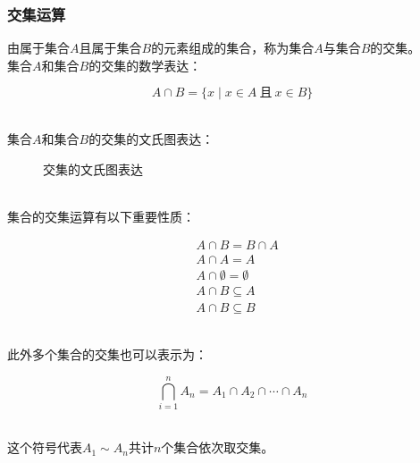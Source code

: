 \documentclass[UTF8]{ctexart}
\begin{document}
\subsubsection{交集运算}
    由属于集合$A$且属于集合$B$的元素组成的集合，称为集合$A$与集合$B$的交集。\\[3mm]
    集合$A$和集合$B$的交集的数学表达：
    \begin{large}
        \begin{equation*}
            A\cap B=\big\{ x\mid x\in A~\text{且}~x\in B\big\}
        \end{equation*}
    \end{large}\\
    集合$A$和集合$B$的交集的文氏图表达：
    \begin{figure}[h]
        \begin{center}
            \caption{交集的文氏图表达}
        \end{center}
    \end{figure}\\
    集合的交集运算有以下重要性质：
    \begin{large}
        \begin{align*}
            &A\cap B=B\cap A\\[3mm]
            &A\cap A=A\\[3mm]
            &A\cap \emptyset=\emptyset\\[3mm]
            &A\cap B\subseteq A\\[3mm]
            &A\cap B\subseteq B
        \end{align*}
    \end{large}\\
    此外多个集合的交集也可以表示为：
    \begin{large}
        \begin{equation*}
            \bigcap_{i=1}^{n}A_n=A_1\cap A_2\cap\cdots\cap A_n
        \end{equation*}
    \end{large}\\
    这个符号代表$A_1\sim A_n$共计$n$个集合依次取交集。
\end{document}
